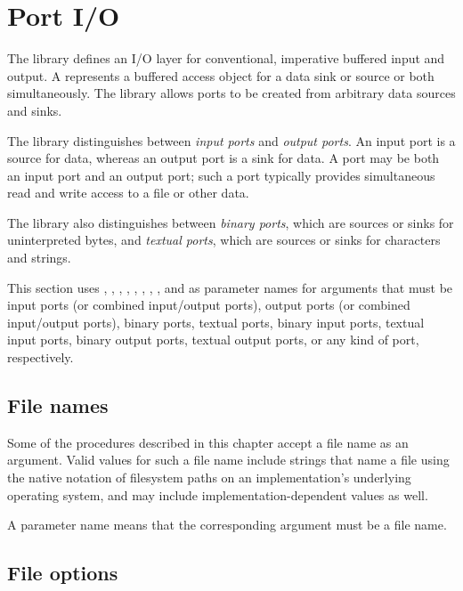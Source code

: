 \section{Port I/O}
\label{portsiosection}

The  library defines an I/O layer for
conventional, imperative buffered input and output.
A  represents a buffered access object
for a data sink or source or both simultaneously.
The library allows ports to be created from arbitrary data sources
and sinks.

The  library distinguishes between \textit{input
  ports} and \textit{output
  ports}.  An input port is a source for data,
whereas an output port is a sink for data.  A port may be both an
input port and an output port; such a port typically provides
simultaneous read and write access to a file or other data.

The  library also distinguishes between
\textit{binary ports}, which are sources
or sinks for uninterpreted bytes, and
\textit{textual ports}, which are sources
or sinks for characters and strings.

This section uses , ,
, ,
, ,
, ,
and  as
parameter names for arguments that must be input ports (or combined
input/output ports), output ports (or combined input/output ports),
binary ports, textual ports, binary input ports, textual input ports,
binary output ports, textual output ports, or any kind of port,
respectively.

\subsection{File names}
\label{filenamesection}

Some of the procedures described in this chapter accept a file name as an
argument. Valid values for such a file name include strings that name a file
using the native notation of filesystem paths on an implementation's
underlying operating system, and may include implementation-dependent
values as well.

A  parameter name means that the
corresponding argument must be a file name.

\subsection{File options}
\label{fileoptionssection}

